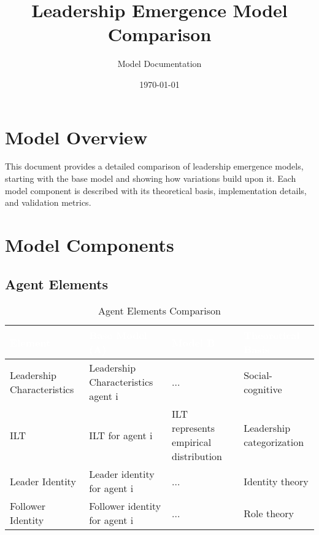 \documentclass[12pt]{article}
\title{Leadership Emergence Model Comparison}
\author{Model Documentation}
\date{\today}
\begin{document}
\maketitle
\tableofcontents
\newpage

\section{Model Overview}
This document provides a detailed comparison of leadership emergence models, starting with the base model and showing how variations build upon it. Each model component is described with its theoretical basis, implementation details, and validation metrics.

\section{Model Components}

\subsection{Agent Elements}
\begin{table}[H]
\begin{tabular}{L{3cm}|L{5cm}|L{5cm}|L{3cm}}
\textcolor{white}{\textbf{Element}} & \textcolor{white}{\textbf{Base Model (A)}} & \textcolor{white}{\textbf{Model B}} & \textcolor{white}{\textbf{Theoretical Basis}} \\
\hline
Leadership Characteristics & Leadership Characteristics agent i & ... & Social-cognitive \\
ILT & ILT for agent i & ILT represents empirical distribution & Leadership categorization \\
Leader Identity & Leader identity for agent i & ... & Identity theory \\
Follower Identity & Follower identity for agent i & ... & Role theory \\
\end{tabular}
\caption{Agent Elements Comparison}
\end{table}
\end{document}
